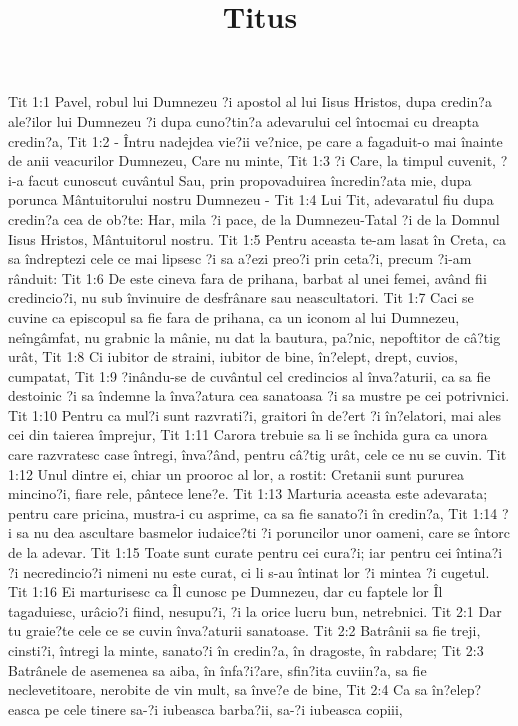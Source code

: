 

\title{Titus}

Tit 1:1  Pavel, robul lui Dumnezeu ?i apostol al lui Iisus Hristos, dupa credin?a ale?ilor lui Dumnezeu ?i dupa cuno?tin?a adevarului cel întocmai cu dreapta credin?a,
Tit 1:2  - Întru nadejdea vie?ii ve?nice, pe care a fagaduit-o mai înainte de anii veacurilor Dumnezeu, Care nu minte,
Tit 1:3  ?i Care, la timpul cuvenit, ?i-a facut cunoscut cuvântul Sau, prin propovaduirea încredin?ata mie, dupa porunca Mântuitorului nostru Dumnezeu -
Tit 1:4  Lui Tit, adevaratul fiu dupa credin?a cea de ob?te: Har, mila ?i pace, de la Dumnezeu-Tatal ?i de la Domnul Iisus Hristos, Mântuitorul nostru.
Tit 1:5  Pentru aceasta te-am lasat în Creta, ca sa îndreptezi cele ce mai lipsesc ?i sa a?ezi preo?i prin ceta?i, precum ?i-am rânduit:
Tit 1:6  De este cineva fara de prihana, barbat al unei femei, având fii credincio?i, nu sub învinuire de desfrânare sau neascultatori.
Tit 1:7  Caci se cuvine ca episcopul sa fie fara de prihana, ca un iconom al lui Dumnezeu, neîngâmfat, nu grabnic la mânie, nu dat la bautura, pa?nic, nepoftitor de câ?tig urât,
Tit 1:8  Ci iubitor de straini, iubitor de bine, în?elept, drept, cuvios, cumpatat,
Tit 1:9  ?inându-se de cuvântul cel credincios al înva?aturii, ca sa fie destoinic ?i sa îndemne la înva?atura cea sanatoasa ?i sa mustre pe cei potrivnici.
Tit 1:10  Pentru ca mul?i sunt razvrati?i, graitori în de?ert ?i în?elatori, mai ales cei din taierea împrejur,
Tit 1:11  Carora trebuie sa li se închida gura ca unora care razvratesc case întregi, înva?ând, pentru câ?tig urât, cele ce nu se cuvin.
Tit 1:12  Unul dintre ei, chiar un prooroc al lor, a rostit: Cretanii sunt pururea mincino?i, fiare rele, pântece lene?e.
Tit 1:13  Marturia aceasta este adevarata; pentru care pricina, mustra-i cu asprime, ca sa fie sanato?i în credin?a,
Tit 1:14  ?i sa nu dea ascultare basmelor iudaice?ti ?i poruncilor unor oameni, care se întorc de la adevar.
Tit 1:15  Toate sunt curate pentru cei cura?i; iar pentru cei întina?i ?i necredincio?i nimeni nu este curat, ci li s-au întinat lor ?i mintea ?i cugetul.
Tit 1:16  Ei marturisesc ca Îl cunosc pe Dumnezeu, dar cu faptele lor Îl tagaduiesc, urâcio?i fiind, nesupu?i, ?i la orice lucru bun, netrebnici.
Tit 2:1  Dar tu graie?te cele ce se cuvin înva?aturii sanatoase.
Tit 2:2  Batrânii sa fie treji, cinsti?i, întregi la minte, sanato?i în credin?a, în dragoste, în rabdare;
Tit 2:3  Batrânele de asemenea sa aiba, în înfa?i?are, sfin?ita cuviin?a, sa fie neclevetitoare, nerobite de vin mult, sa înve?e de bine,
Tit 2:4  Ca sa în?elep?easca pe cele tinere sa-?i iubeasca barba?ii, sa-?i iubeasca copiii,
